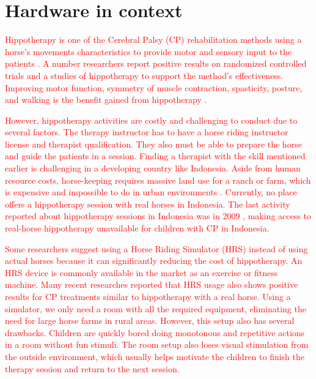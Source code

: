 \section{Hardware in context}


\textcolor{red}{Hippotherapy is one of the Cerebral Palsy (CP) rehabilitation methods using a horse's movements characteristics to provide motor and sensory input to the patients \cite{Koca2015WhatHippotherapy}.
A number researchers report positive results on randomized controlled trials and a studies of hippotherapy to support the method's effectiveness.
Improving motor function, symmetry of muscle contraction, spasticity, posture, and walking is the benefit gained from hippotherapy \cite{Pantera2022DoesFunctioning}.}

\textcolor{red}{However, hippotherapy activities are costly and challenging to conduct due to several factors. The therapy instructor has to have a horse riding instructor license and therapist qualification. They also must be able to prepare the horse and guide the patients in a session. Finding a therapist with the skill mentioned earlier is challenging in a developing country like Indonesia.
Aside from human resource costs, horse-keeping requires massive land use for a ranch or farm, which is expensive and impossible to do in urban environments \cite{Scott2005SpecialRiding}.
Currently, no place offers a hippotherapy session with real horses in Indonesia. The last activity reported about hippotherapy sessions in Indonesia was in 2009 \cite{Setyawan2010TerapiAutisme}, making access to real-horse hippotherapy unavailable for children with CP in Indonesia.}

\textcolor{red}{Some researchers suggest using a Horse Riding Simulator (HRS) instead of using actual horses because it can significantly reducing the cost of hippotherapy. An HRS device is commonly available in the market as an exercise or fitness machine.
Many recent researches \cite{Temcharoensuk2015EffectTrial,Dominguez-Romero2019EffectivenessMeta-Analysis, Kim2018EquineRiding, Chinniah2020EffectsPalsy} reported that HRS usage also shows positive results for CP treatments similar to hippotherapy with a real horse.
Using a simulator, we only need a room with all the required equipment, eliminating the need for large horse farms in rural areas. However, this setup also has several drawbacks. Children are quickly bored doing monotonous and repetitive actions in a room without fun stimuli. The room setup also loses visual stimulation from the outside environment, which usually helps motivate the children to finish the therapy session and return to the next session.}

